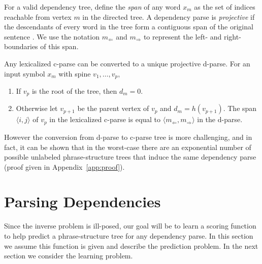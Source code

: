 \documentclass[11pt,letterpaper]{article}
\newcommand{\Left}[1]{#1_{\Leftarrow}}
\newcommand{\Right}[1]{#1_{\Rightarrow}}
\newcommand{\Span}[1]{\langle #1 \rangle}
\begin{document}
For a valid dependency tree, define the \textit{span} of any word $x_m$ as the set of indices reachable from vertex $m$ in the directed tree. A dependency parse is \textit{projective} if the descendants of every word in the tree form a contiguous span of the original sentence \cite{}. We use the notation $\Left{m}$ and $\Right{m}$ to represent the left- and
right-boundaries of this span.


Any lexicalized c-parse can be converted to a unique projective d-parse.
For an input symbol $x_m$ with spine $v_1, \ldots, v_p$,

\begin{enumerate}
\item If $v_p$ is the root of the tree,
then $d_m = 0$.
\item Otherwise let $v_{p+1}$ be the parent vertex of
$v_p$ and $d_m = h(v_{p+1})$. The span $\Span{i, j}$ of $v_p$ in the lexicalized c-parse is equal to  $\Span{\Left{m}, \Right{m}}$
in the  d-parse.
\end{enumerate}


However the conversion from d-parse to c-parse tree is more challenging, and in fact, it can be shown that in the worst-case there are an
exponential number of possible unlabeled phrase-structure trees that induce the same dependency parse (proof given in Appendix~\ref{app:proof}).


\section{Parsing Dependencies}

Since the inverse problem is ill-posed, our goal will
be to learn a scoring function to help predict a
phrase-structure tree for any dependency parse. In
this section we assume this function is given and describe
the prediction problem. In the next section we consider
the learning problem.
\end{document}
